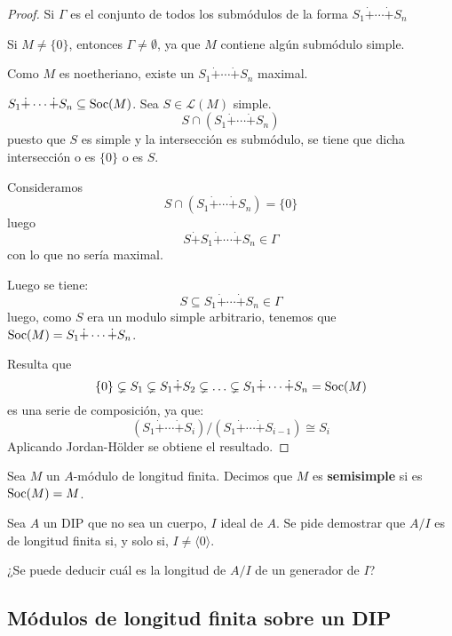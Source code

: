\begin{proof}
  Si \(\Gamma\) es el conjunto de todos los submódulos de la forma
  \(
    S_1\dot{+}\cdots\dot{+} S_n
  \)

  Si \(M\neq\{0\}\), entonces \(\Gamma\neq\emptyset\), ya que \(M\)
  contiene algún submódulo simple.

  Como \(M\) es noetheriano, existe un
  \(
    S_1\dot{+}\cdots\dot{+} S_n
  \) maximal.

  \(
    S_1\dot{+}\cdots\dot{+} S_n\subseteq\operatorname{Soc}(M)
  \). Sea \(S\in\mathcal{L}(M)\) simple.
  \[
    S\cap(
    S_1\dot{+}\cdots\dot{+} S_n
    )
  \]
  puesto que \(S\) es simple y la intersección es submódulo, se tiene
  que dicha intersección o es \(\{0\}\) o es \(S\).

  Consideramos
  \[
    S\cap(
    S_1\dot{+}\cdots\dot{+} S_n
    ) = \{0\}
  \]
  luego
  \[
    S\dot{+}S_1\dot{+}\cdots\dot{+} S_n\in\Gamma
  \]
  con lo que no sería maximal.

  Luego se tiene:
  \[
    S\subseteq
    S_1\dot{+}\cdots\dot{+} S_n\in\Gamma
  \]
  luego, como \(S\) era un modulo simple arbitrario, tenemos que
  \(\operatorname{Soc}(M)=
    S_1\dot{+}\cdots\dot{+} S_n
  \).

  Resulta que
  \[
    \{0\}\subsetneq S_1\subsetneq S_1\dot{+} S_2\subsetneq\ldots
    \subsetneq
    S_1\dot{+}\cdots\dot{+} S_n=\operatorname{Soc}(M)
  \]
  es una serie de composición, ya que:
  \[
    (S_1\dot{+}\cdots\dot{+} S_i)/
    (S_1\dot{+}\cdots\dot{+} S_{i-1})\cong
    S_i
  \]
  Aplicando Jordan-Hölder se obtiene el resultado.
\end{proof}

\begin{df}
  Sea \(M\) un \(A\)-módulo de longitud finita. Decimos que \(M\) es \textbf{semisimple}
  si es \(\operatorname{Soc}(M)=M\).
\end{df}

\begin{ejercicio}
  Sea \(A\) un DIP que no sea un cuerpo,
  \(I\) ideal de \(A\). Se pide demostrar
  que \(A/I\) es de longitud finita si, y solo si, \(I\neq\langle 0\rangle\).
\end{ejercicio}

¿Se puede deducir cuál es la longitud de \(A/I\) de un generador de \(I\)?

\subsection{Módulos de longitud finita sobre un DIP}

